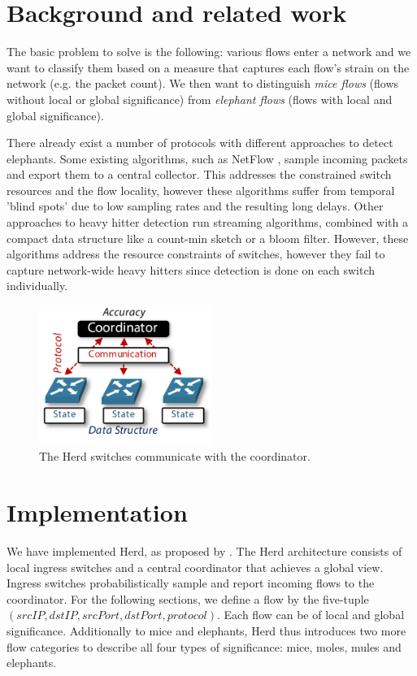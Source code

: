 \documentclass[11pt,oneside,a4paper]{article}
\begin{document}
\section{Background and related work}

The basic problem to solve is the following: various flows enter a network and we want to classify them based on a measure that captures each flow's strain on the network (e.g. the packet count). We then want to distinguish \textit{mice flows} (flows without local or global significance) from \textit{elephant flows} (flows with local and global significance).

\noindent There already exist a number of protocols with different approaches to detect elephants. Some existing algorithms, such as NetFlow \cite{claise2004netflow}, sample incoming packets and export them to a central collector. This addresses the constrained switch resources and the flow locality, however these algorithms suffer from temporal 'blind spots' due to low sampling rates and the resulting long delays. Other approaches to heavy hitter detection run streaming algorithms, combined with a compact data structure like a count-min sketch \cite{cormode2003countmin} or a bloom filter. However, these algorithms address the resource constraints of switches, however they fail to capture network-wide heavy hitters since detection is done on each switch individually.

\begin{figure}
	\centering
	\includegraphics[width=0.5\textwidth,scale=1]{figures/global_local_paper}
	\caption{The Herd switches communicate with the coordinator. \cite{anon2019herd}}
	\label{fig:global_fig}
\end{figure}

\section{Implementation}

We have implemented Herd, as proposed by \cite{anon2019herd}. The Herd architecture consists of local ingress switches and a central coordinator that achieves a global view. Ingress switches probabilistically sample and report incoming flows to the coordinator. For the following sections, we define a flow by the five-tuple $(srcIP, dstIP, srcPort, dstPort, protocol)$. Each flow can be of local and global significance. Additionally to mice and elephants, Herd thus introduces two more flow categories to describe all four types of significance: mice, moles, mules and elephants.
\end{document}
